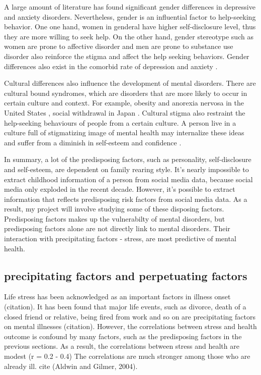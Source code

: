 A large amount of literature has found significant gender differences in depressive and anxiety disorders. Nevertheless, gender is an influential factor to help-seeking behavior. One one hand, women in genderal have higher self-disclosure level, thus they are more willing to seek help. On the other hand, gender stereotype such as women are prone to affective disorder and men are prone to substance use disorder also reinforce the stigma and affect the help seeking behaviors. Gender differences also exist in the comorbid rate of depression and anxiety \cite{afifi2007gender}. 

Cultural differences also influence the development of mental disorders. There are cultural bound syndromes, which are disorders that are more likely to occur in certain culture and context. For example, obesity and anorexia nervosa in the United States \cite{ritenbaugh1982obesity}, social withdrawal in Japan \cite{teo2010hikikomori}. Cultural stigma also restraint the help-seeking behaviours of people from a certain culture. A person live in a culture full of stigmatizing image of mental health may internalize these ideas and suffer from a diminish in self-esteem and confidence \cite{corrigan1998impact,holmes1998individual}. 

In summary, a lot of the predisposing factors, such as personality, self-disclosure and self-esteem, are dependent on family rearing style. It's nearly impossible to extract childhood information of a person from social media data, because social media only exploded in the recent decade. However, it's possible to extract information that reflects predisposing risk factors from social media data. As a result, my project will involve studying some of these disposing factors. Predisposing factors makes up the vulnerabilty of mental disorders, but predisposing factors alone are not directly link to mental disorders. Their interaction with precipitating factors - stress, are most predictive of mental health.


\subsection{precipitating factors and perpetuating factors}

Life stress has been acknowledged as an important factors in illness onset (citation). It has been found that major life events, such as divorce, death of a closed friend or relative, being fired from work and so on are precipitating factors on mental illnesses (citation). However, the correlations between stress and health outcome is confound by many factors, such as the predisposing factors in the previous sections. As a result, the correlations between stress and health are modest (r =  0.2 - 0.4)  The correlations are much stronger among those who are already ill. cite (Aldwin and Gilmer, 2004).

